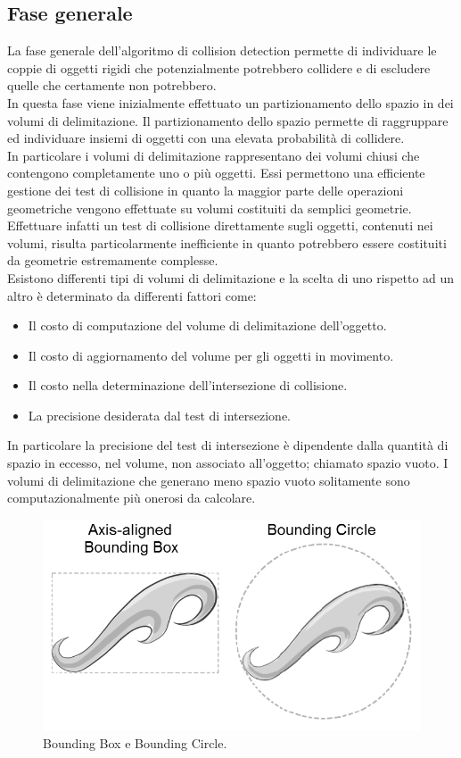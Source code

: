 \subsection{Fase generale}
La fase generale dell’algoritmo di collision detection permette di individuare le coppie di oggetti rigidi che potenzialmente potrebbero collidere e di escludere quelle che certamente non potrebbero.
\\
In questa fase viene inizialmente effettuato un partizionamento dello spazio in dei volumi di delimitazione. Il partizionamento dello spazio permette di raggruppare ed individuare insiemi di oggetti con una elevata probabilità di collidere.
\\
In particolare i volumi di delimitazione rappresentano dei volumi chiusi che contengono completamente uno o più oggetti. Essi permettono una efficiente gestione dei test di collisione in quanto la maggior parte delle operazioni geometriche vengono effettuate su volumi costituiti da semplici geometrie.
\\
Effettuare infatti un test di collisione direttamente sugli oggetti, contenuti nei volumi, risulta particolarmente inefficiente in quanto potrebbero essere costituiti da geometrie estremamente complesse.
\\
Esistono differenti tipi di volumi di delimitazione e la scelta di uno rispetto ad un altro è determinato da differenti fattori come:
\begin{itemize}
\item Il costo di computazione del volume di delimitazione dell’oggetto.
\item Il costo di aggiornamento del volume per gli oggetti in movimento.
\item Il costo nella determinazione dell’intersezione di collisione.
\item La precisione desiderata dal test di intersezione.
\end{itemize}
In particolare la precisione del test di intersezione è dipendente dalla quantità di spazio in eccesso, nel volume, non associato all’oggetto; chiamato spazio vuoto.
I volumi di delimitazione che generano meno spazio vuoto solitamente sono computazionalmente più onerosi da calcolare.
\begin{figure}[htb]
 \centering
 \includegraphics[width=0.7\linewidth]{images/chapter_navigazione_scena/box1.png}\hfill
 \caption[Bounding Box e Bounding Circle.]{Bounding Box e Bounding Circle.}
 \label{fig:navigazione_scena_navigator_oculus}
\end{figure}
